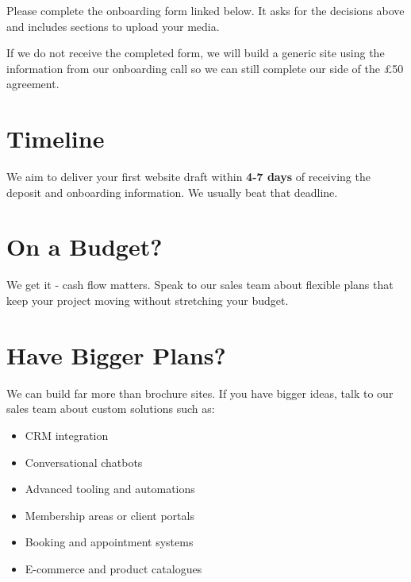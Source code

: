 \documentclass[11pt,a4paper]{article}
\begin{document}
Please complete the onboarding form linked below. It asks for the decisions above and includes sections to upload your media.

\begin{center}
\end{center}

\noindent If we do not receive the completed form, we will build a generic site using the information from our onboarding call so we can still complete our side of the £50 agreement.

\section{Timeline}

We aim to deliver your first website draft within \textbf{4-7 days} of receiving the deposit and onboarding information. We usually beat that deadline.

\section{On a Budget?}

We get it - cash flow matters. Speak to our sales team about flexible plans that keep your project moving without stretching your budget.

\section{Have Bigger Plans?}

We can build far more than brochure sites. If you have bigger ideas, talk to our sales team about custom solutions such as:

\begin{itemize}[leftmargin=*]
    \item CRM integration
    \item Conversational chatbots
    \item Advanced tooling and automations
    \item Membership areas or client portals
    \item Booking and appointment systems
    \item E-commerce and product catalogues
\end{itemize}
\end{document}
